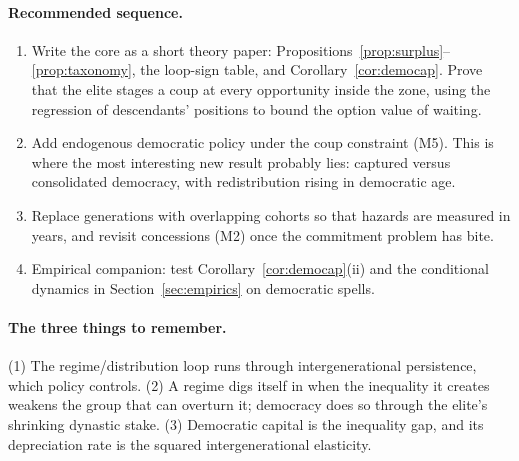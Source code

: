 \documentclass[11pt]{article}
\theoremstyle{remark}
\begin{document}
\paragraph{Recommended sequence.}
\begin{enumerate}
\item Write the core as a short theory paper: Propositions~\ref{prop:surplus}--\ref{prop:taxonomy}, the loop-sign table, and Corollary~\ref{cor:democap}.  Prove that the elite stages a coup at every opportunity inside the zone, using the regression of descendants' positions to bound the option value of waiting.
\item Add endogenous democratic policy under the coup constraint (M5).  This is where the most interesting new result probably lies: captured versus consolidated democracy, with redistribution rising in democratic age.
\item Replace generations with overlapping cohorts so that hazards are measured in years, and revisit concessions (M2) once the commitment problem has bite.
\item Empirical companion: test Corollary~\ref{cor:democap}(ii) and the conditional dynamics in Section~\ref{sec:empirics} on democratic spells.
\end{enumerate}

\paragraph{The three things to remember.}  (1) The regime/distribution loop runs through intergenerational persistence, which policy controls.  (2) A regime digs itself in when the inequality it creates weakens the group that can overturn it; democracy does so through the elite's shrinking dynastic stake.  (3) Democratic capital is the inequality gap, and its depreciation rate is the squared intergenerational elasticity.
\end{document}
